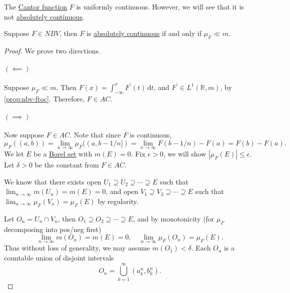 \begin{eg}
	The \hyperref[sssec:Cantor-Function]{Cantor function} \(F\) is uniformly continuous.
	However, we will see that it is not \hyperref[def:absolutely-continuous-function]{absolutely continuous}.
\end{eg}

\begin{proposition}\label{prop:abs-cts}
	Suppose \(F \in NBV\), then \(F\) is \hyperref[def:absolutely-continuous-function]{absolutely continuous} if and only if \(\mu_F \ll m\).
\end{proposition}
\begin{proof}
	We prove two directions.
	\paragraph{\((\impliedby)\)}
	Suppose \(\mu_F \ll m\). Then \(F(x) = \int_{-\infty}^x F^\prime (t) \,\mathrm{d}t\), and \(F^\prime \in L^1(\mathbb{R},m)\), by \autoref{prop:nbv-ftoc}. Therefore, \(F \in AC\).

	\paragraph{\((\implies)\)}
	Now suppose \(F \in AC\). Note that since \(F\) is continuous,
	\[
		\mu_F((a,b)) = \lim_{n \to \infty} \mu_F((a,b-1/n]) = \lim_{n \to \infty} F(b-1/n) - F(a) = F(b) - F(a).
	\]
	We let \(E\) be a \hyperref[def:Borel-set]{Borel set} with \(m(E) = 0\). Fix \(\epsilon > 0\), we will show \(\left\vert \mu_F(E) \right\vert \leq \epsilon \).
	Let \(\delta > 0\) be the constant from \(F \in AC\).

	We know that there exists open \(U_1 \supseteq U_2 \supseteq \cdots \supseteq E\) such that \(\lim_{n \to \infty} m(U_n) = m(E) = 0\), and open
	\(V_1 \supseteq V_2 \supseteq \cdots \supseteq E\) such that \(\lim_{n \to \infty} \mu_F(V_n) = \mu_F(E)\) by regularity.

	Let \(O_n = U_n \cap V_n\), then \(O_1 \supseteq O_2 \supseteq \cdots \supseteq E\), and by monotonicity (for \(\mu_F\) decomposing into pos/neg first)
	\[
		\lim_{n \to \infty} m(O_n) = m(E) = 0,\quad \lim_{n \to \infty} \mu_F(O_n) = \mu_F(E).
	\]
	Thus without loss of generality, we may assume \(m(O_1) < \delta\). Each \(O_n\) is a countable union of disjoint intervals
	\[
		O_n = \bigcup_{k=1}^\infty \left( a_k^n, b_k^n \right).
	\]


\end{proof}
